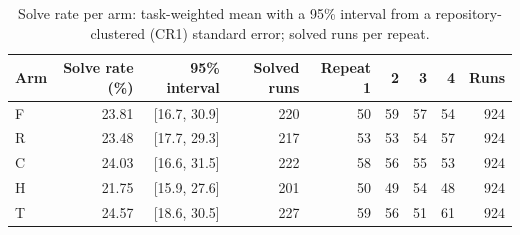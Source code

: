 \begin{table}[!htb]
\centering
\caption{Solve rate per arm: task-weighted mean with a 95\% interval from a repository-clustered (CR1) standard error; solved runs per repeat.}\label{tab:s-rates}
\footnotesize
\begin{tabular}{lrrrrrrrr}
\toprule
Arm & Solve rate (\%) & 95\% interval & Solved runs & Repeat 1 & 2 & 3 & 4 & Runs \\
\midrule
F & 23.81 & [16.7, 30.9] & 220 & 50 & 59 & 57 & 54 & 924 \\
R & 23.48 & [17.7, 29.3] & 217 & 53 & 53 & 54 & 57 & 924 \\
C & 24.03 & [16.6, 31.5] & 222 & 58 & 56 & 55 & 53 & 924 \\
H & 21.75 & [15.9, 27.6] & 201 & 50 & 49 & 54 & 48 & 924 \\
T & 24.57 & [18.6, 30.5] & 227 & 59 & 56 & 51 & 61 & 924 \\
\bottomrule
\end{tabular}
\end{table}
